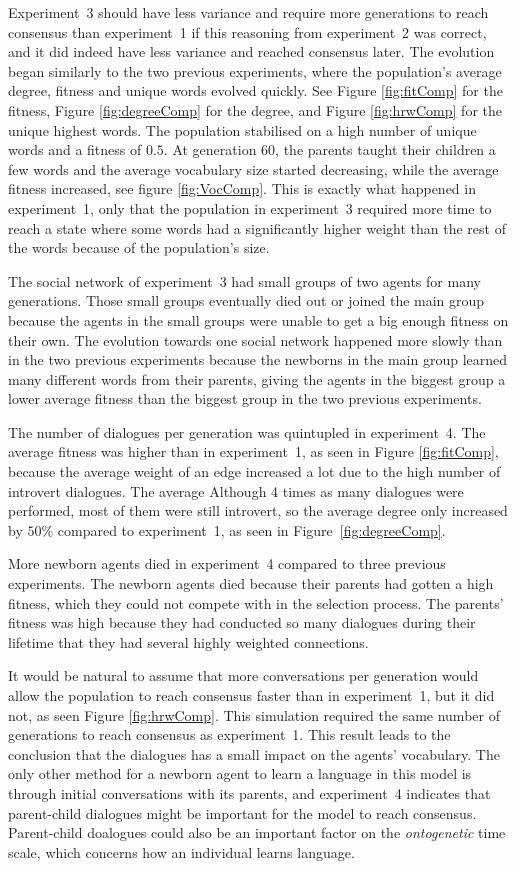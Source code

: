 Experiment~3 should have less variance and require more generations to reach consensus than experiment~1 if this reasoning from experiment~2 was correct, and it did indeed have less variance and reached consensus later. The evolution began similarly to the two previous experiments, where the population's average degree, fitness and unique words evolved quickly. See Figure \ref{fig:fitComp} for the fitness, Figure \ref{fig:degreeComp} for the degree, and Figure \ref{fig:hrwComp} for the unique highest words. The population stabilised on a high number of unique words and a fitness of $0.5$. At generation $60$, the parents taught their children a few words and the average vocabulary size started decreasing, while the average fitness increased, see figure \ref{fig:VocComp}. This is exactly what happened in experiment~1, only that the population in experiment~3 required more time to reach a state where some words had a significantly higher weight than the rest of the words because of the population’s size. 

The social network of experiment~3 had small groups of two agents for many generations. Those small groups eventually died out or joined the main group because the agents in the small groups were unable to get a big enough fitness on their own. The evolution towards one social network happened more slowly than in the two previous experiments because the newborns in the main group learned many different words from their parents, giving the agents in the biggest group a lower average fitness than the biggest group in the two previous experiments.

The number of dialogues per generation was quintupled in experiment~4. The average fitness was higher than in experiment~1, as seen in Figure \ref{fig:fitComp}, because the average weight of an edge increased a lot due to the high number of introvert dialogues. The average Although 4 times as many dialogues were performed, most of them were still introvert, so the average degree only increased by $50\%$ compared to experiment~1, as seen in Figure~\ref{fig:degreeComp}.

More newborn agents died in experiment~4 compared to three previous experiments. The newborn agents died because their parents had gotten a high fitness, which they could not compete with in the selection process. The parents' fitness was high because they had conducted so many dialogues during their lifetime that they had several highly weighted connections. 

It would be natural to assume that more conversations per generation would allow the population to reach consensus faster than in experiment~1, but it did not, as seen Figure \ref{fig:hrwComp}. This simulation required the same number of generations to reach consensus as experiment~1. This result leads to the conclusion that the dialogues has a small impact on the agents' vocabulary. The only other method for a newborn agent to learn a language in this model is through initial conversations with its parents, and experiment~4 indicates that parent-child dialogues might be important for the model to reach consensus. Parent-child doalogues could also be an important factor on the \textit{ontogenetic} time scale, which concerns how an individual learns language.

